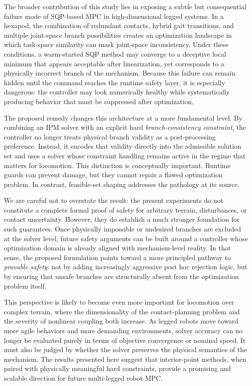 The broader contribution of this study lies in exposing a subtle but consequential failure mode of SQP-based MPC in high-dimensional legged systems. In a hexapod, the combination of redundant contacts, hybrid gait transitions, and multiple joint-space branch possibilities creates an optimization landscape in which task-space similarity can mask joint-space inconsistency. Under these conditions, a warm-started SQP method may converge to a deceptive local minimum that appears acceptable after linearization, yet corresponds to a physically incorrect branch of the mechanism. Because this failure can remain hidden until the command reaches the runtime safety layer, it is especially dangerous: the controller may look numerically healthy while systematically producing behavior that must be suppressed after optimization.

The proposed remedy changes this architecture at a more fundamental level. By combining an IPM solver with an explicit hard \emph{branch-consistency constraint}, the controller no longer treats physical branch validity as a post-processing preference. Instead, it encodes that validity directly into the admissible solution set and uses a solver whose constraint handling remains active in the regime that matters for locomotion. This distinction is conceptually important. Runtime guards can prevent damage, but they cannot repair a flawed optimization problem. In contrast, feasible-set shaping addresses the pathology at its source.

We are careful not to overstate the result: the present experiments do not constitute a complete formal proof of safety for arbitrary terrain, disturbances, or contact uncertainty. However, they do establish a much stronger foundation for such guarantees. Once physically impossible or undesired branches are excluded at the solver level, future safety arguments can be built around a controller whose optimization domain is already aligned with mechanism-level reality. In that sense, the proposed formulation points toward a more principled pathway to \emph{provable safety}: not by adding increasingly aggressive post hoc rejection logic, but by ensuring that unsafe branches are structurally absent from the optimization problem itself.

This perspective is likely to become even more important for locomotion over complex terrain, where the dimensionality of the contact-planning problem and the severity of nonlinear coupling both increase. As legged robots move toward more agile behaviors and more demanding environments, solver accuracy can no longer be evaluated purely in terms of objective convergence or nominal speed. It must also be judged by whether the solver preserves the physical semantics of the mechanism. The results presented here suggest that interior-point methods, when paired with physically meaningful hard constraints, provide a promising and scalable direction for future multi-legged robot MPC.
